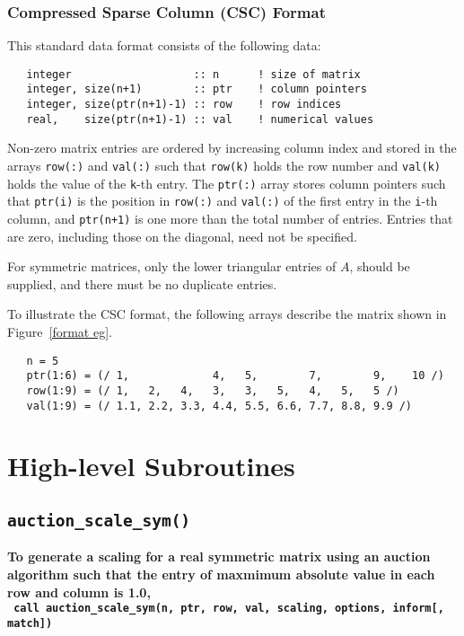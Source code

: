 \subsubsection{Compressed Sparse Column (CSC) Format} \label{cscformat}
This standard data format consists of the following data:
\begin{verbatim}
   integer                   :: n      ! size of matrix
   integer, size(n+1)        :: ptr    ! column pointers
   integer, size(ptr(n+1)-1) :: row    ! row indices
   real,    size(ptr(n+1)-1) :: val    ! numerical values
\end{verbatim}
Non-zero matrix entries are ordered by increasing column index and stored in
the arrays \texttt{row(:)} and \texttt{val(:)} such that \texttt{row(k)} holds
the row number and \texttt{val(k)} holds the value of the \texttt{k}-th entry.
The \texttt{ptr(:)} array stores column pointers such that \texttt{ptr(i)} is
the position in \texttt{row(:)} and \texttt{val(:)} of
the first entry in the \texttt{i}-th column, and \texttt{ptr(n+1)} is one more
than the total number of entries.
Entries that are zero, including those on the diagonal, need not be specified.

For symmetric matrices, only the lower triangular entries of $A$, should be
supplied, and there must be no duplicate entries. 

To illustrate the CSC format, the following arrays describe the matrix shown in
Figure~\ref{format eg}.
\begin{verbatim}
   n = 5
   ptr(1:6) = (/ 1,             4,   5,        7,        9,    10 /)
   row(1:9) = (/ 1,   2,   4,   3,   3,   5,   4,   5,   5 /)
   val(1:9) = (/ 1.1, 2.2, 3.3, 4.4, 5.5, 6.6, 7.7, 8.8, 9.9 /)
\end{verbatim}


\section{High-level Subroutines}


\subsection{\texttt{auction\_scale\_sym()}}

\textbf{\noindent
   To generate a scaling for a real symmetric matrix using an auction algorithm such that the entry of maxmimum absolute value in each row and column is 1.0,
   \vspace*{0.1cm} \\
   \texttt{ \hspace*{0.2cm}
      call auction\_scale\_sym(n, ptr, row, val, scaling, options, inform[, match])
   }
   \vspace{0.3cm}
}

